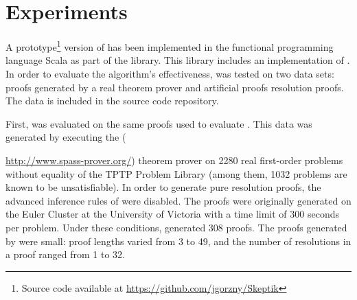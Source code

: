 \section{Experiments} \label{sec:exp}

A prototype\footnote{Source code available at \url{https://github.com/jgorzny/Skeptik}} version of {\FORPI} has been implemented in the functional programming language Scala as part of the \skeptik
library. This library includes an implementation of {\GFOLU} \cite{GFOLU}. In order to evaluate the algorithm's effectiveness, {\FORPI} was tested on two data sets: proofs generated by a real theorem prover and artificial proofs resolution proofs. The data is included in the source code repository.

First, {\FORPI} was evaluated on the same proofs used to evaluate {\GFOLU}. This data was generated by executing the {\SPASS} ({\url{http://www.spass-prover.org/}) theorem prover on 2280 real first-order problems without equality of the TPTP Problem Library (among them, 1032 problems are known to be unsatisfiable). In order to generate pure resolution proofs, the advanced inference rules of {\SPASS} were disabled. The proofs were originally generated on the Euler Cluster at the University of Victoria with a time limit of 300 seconds per problem. Under these conditions, {\SPASS} generated 308 proofs. The proofs generated by {\SPASS} were small: proof lengths varied from 3 to 49, and the number of resolutions in a proof ranged from 1 to 32.


}
